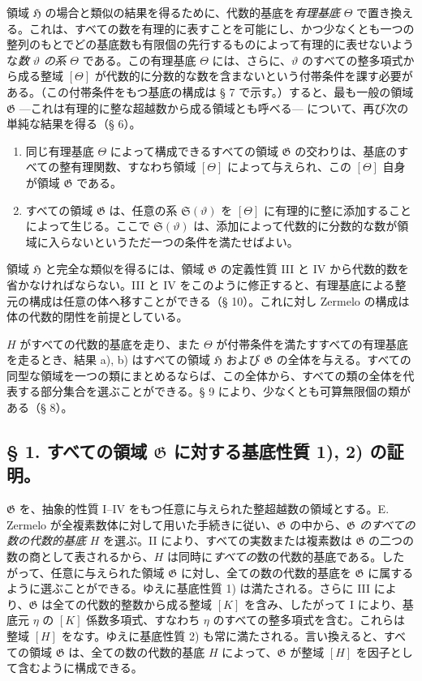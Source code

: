 \documentclass[11pt]{article}
\begin{document}
領域 $\mathfrak H$ の場合と類似の結果を得るために、代数的基底を\emph{有理基底} $\Theta$ で置き換える。これは、すべての数を有理的に表すことを可能にし、かつ少なくとも一つの整列のもとでどの基底数も有限個の先行するものによって有理的に表せないような\emph{数} $\vartheta$ \emph{の系} $\Theta$ である。この有理基底 $\Theta$ には、さらに、$\vartheta$ のすべての整多項式から成る整域 $[\Theta]$ が代数的に分数的な数を含まないという付帯条件を課す必要がある。（この付帯条件をもつ基底の構成は § 7 で示す。）すると、最も一般の領域 $\mathfrak G$ ---これは有理的に整な超越数から成る領域とも呼べる--- について、再び次の単純な結果を得る（§ 6）。
\begin{enumerate}
\item[a)] 同じ有理基底 $\Theta$ によって構成できるすべての領域 $\mathfrak G$ の交わりは、基底のすべての整有理関数、すなわち領域 $[\Theta]$ によって与えられ、この $[\Theta]$ 自身が領域 $\mathfrak G$ である。
\item[b)] すべての領域 $\mathfrak G$ は、任意の系 $\mathfrak S(\vartheta)$ を $[\Theta]$ に有理的に整に添加することによって生じる。ここで $\mathfrak S(\vartheta)$ は、添加によって代数的に分数的な数が領域に入らないというただ一つの条件を満たせばよい。
\end{enumerate}

領域 $\mathfrak H$ と完全な類似を得るには、領域 $\mathfrak G$ の定義性質 III と IV から代数的数を省かなければならない。III と IV をこのように修正すると、有理基底による整元の構成は任意の体へ移すことができる（§ 10）。これに対し Zermelo の構成は体の代数的閉性を前提としている。

$H$ がすべての代数的基底を走り、また $\Theta$ が付帯条件を満たすすべての有理基底を走るとき、結果 a), b) はすべての領域 $\mathfrak H$ および $\mathfrak G$ の全体を与える。すべての同型な領域を一つの類にまとめるならば、この全体から、すべての類の全体を代表する部分集合を選ぶことができる。§ 9 により、少なくとも可算無限個の類がある（§ 8）。

\subsection*{§ 1. すべての領域 $\mathfrak G$ に対する基底性質 1), 2) の証明。}

$\mathfrak G$ を、抽象的性質 I--IV をもつ任意に与えられた整超越数の領域とする。E. Zermelo が全複素数体に対して用いた手続きに従い、$\mathfrak G$ の中から、\emph{$\mathfrak G$ のすべての数の代数的基底} $H$ を選ぶ。II により、すべての実数または複素数は $\mathfrak G$ の二つの数の商として表されるから、$H$ は同時に\emph{すべての}数の代数的基底である。したがって、任意に与えられた領域 $\mathfrak G$ に対し、全ての数の代数的基底を $\mathfrak G$ に属するように選ぶことができる。ゆえに基底性質 1) は満たされる。さらに III により、$\mathfrak G$ は全ての代数的整数から成る整域 $[K]$ を含み、したがって I により、基底元 $\eta$ の $[K]$ 係数多項式、すなわち $\eta$ のすべての整多項式を含む。これらは整域 $[H]$ をなす。ゆえに基底性質 2) も常に満たされる。言い換えると、すべての領域 $\mathfrak G$ は、全ての数の代数的基底 $H$ によって、$\mathfrak G$ が整域 $[H]$ を因子として含むように構成できる。
\end{document}
